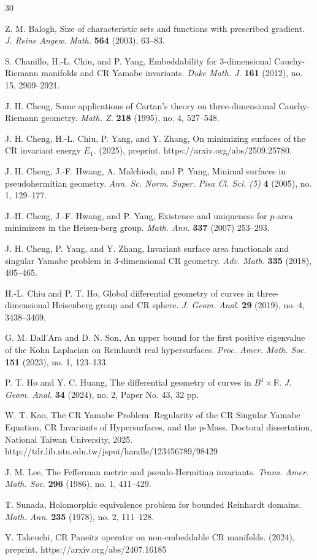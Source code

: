 \documentclass{amsart}
\theoremstyle{Corollary}
\numberwithin{equation}{section}
\begin{document}

\begin{thebibliography}{30}

Z. M. Balogh,  
Size of characteristic sets and functions with prescribed gradient.  
\textit{J. Reine Angew. Math.} \textbf{564} (2003), 63–83. 


S. Chanillo, H.-L. Chiu, and P. Yang,  Embeddability for 3-dimensional Cauchy-Riemann manifolds and CR Yamabe invariants. \textit{Duke Math. J.} \textbf{161} (2012), no. 15, 2909–2921. 



J. H. Cheng, 
Some applications of Cartan's theory on three-dimensional Cauchy-Riemann geometry. \textit{Math. Z.} \textbf{218} (1995), no. 4, 527–548. 


J. H. Cheng, H.-L. Chiu, P. Yang, and Y. Zhang,
On minimizing surfaces of the CR invariant energy $E_1$. (2025), preprint. https://arxiv.org/abs/2509.25780. 

J. H.  Cheng, J.-F. Hwang, A. Malchiodi, and P. Yang,  
 Minimal surfaces in pseudohermitian geometry. \textit{Ann. Sc. Norm. Super. Pisa Cl. Sci. (5)} \textbf{4} (2005), no. 1, 129–177. 

J.-H. Cheng, J.-F. Hwang, and P. Yang, Existence and uniqueness for $p$-area minimizers in the Heisen-berg group. \textit{Math. Ann.} \textbf{337} (2007) 253–293.

J. H. Cheng, P. Yang, and Y. Zhang,  Invariant surface area functionals and singular Yamabe problem in 3-dimensional CR geometry. 
\textit{Adv. Math.} \textbf{335} (2018), 405–465. 
 
H.-L. Chiu and P. T. Ho, 
Global differential geometry of curves in three-dimensional Heisenberg group and CR sphere. 
\textit{J. Geom. Anal.} \textbf{29} (2019), no. 4, 3438–3469. 


G. M.  Dall'Ara and D. N. Son,   An upper bound for the first positive eigenvalue of the Kohn Laplacian on Reinhardt real hypersurfaces. \textit{Proc. Amer. Math. Soc.} \textbf{151} (2023), no. 1, 123–133.
 
P. T. Ho and Y. C. Huang,  
The differential geometry of curves in $B^1\times \mathbb{R}$. 
\textit{J. Geom. Anal.} \textbf{34} (2024), no. 2, Paper No. 43, 32 pp. 

 W. T. Kao, 
	The CR Yamabe Problem: Regularity of the CR Singular Yamabe Equation, CR Invariants of Hypersurfaces, and the p-Mass.
Doctoral dissertation, National Taiwan University, 2025. 
http://tdr.lib.ntu.edu.tw/jspui/handle/123456789/98429

J. M. Lee,  
The Fefferman metric and pseudo-Hermitian invariants.
\textit{Trans. Amer. Math. Soc.} \textbf{296} (1986), no. 1, 411–429. 

T. Sunada,  
Holomorphic equivalence problem for bounded Reinhardt domains.
\textit{Math. Ann.} \textbf{235} (1978), no. 2, 111–128. 

Y. Takeuchi, CR Paneitz operator on non-embeddable CR manifolds. (2024), preprint.
https://arxiv.org/abs/2407.16185 

\end{thebibliography}
\end{document}
